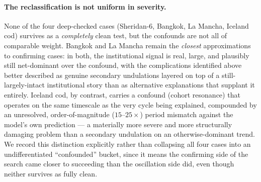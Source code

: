 \documentclass[twocolumn,10pt]{article}
\begin{document}
\paragraph{The reclassification is not uniform in severity.} None of the four deep-checked cases (Sheridan-6, Bangkok, La Mancha, Iceland cod) survives as a \emph{completely} clean test, but the confounds are not all of comparable weight. Bangkok and La Mancha remain the \emph{closest} approximations to confirming cases: in both, the institutional signal is real, large, and plausibly still net-dominant over the confound, with the complications identified above better described as genuine secondary undulations layered on top of a still-largely-intact institutional story than as alternative explanations that supplant it entirely. Iceland cod, by contrast, carries a confound (cohort resonance) that operates on the same timescale as the very cycle being explained, compounded by an unresolved, order-of-magnitude ($15$--$25\times$) period mismatch against the model's own prediction --- a materially more severe and more structurally damaging problem than a secondary undulation on an otherwise-dominant trend. We record this distinction explicitly rather than collapsing all four cases into an undifferentiated ``confounded'' bucket, since it means the confirming side of the search came closer to succeeding than the oscillation side did, even though neither survives as fully clean.
\end{document}
